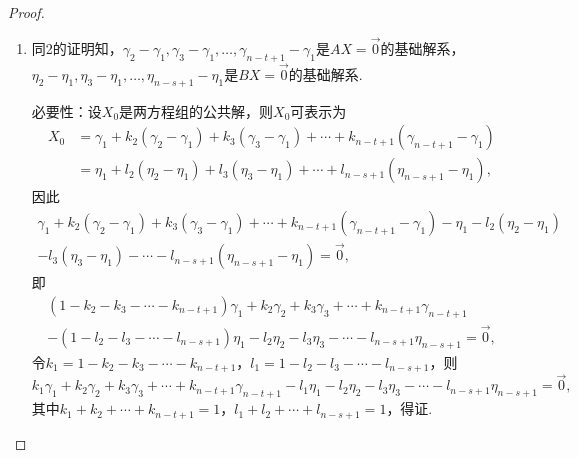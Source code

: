 \begin{proof}
\begin{enumerate}
        \item 同2的证明知，$\gamma_2-\gamma_1,\gamma_3-\gamma_1,\ldots,\gamma_{n-t+1}-\gamma_1$是$AX=\vec{0}$的基础解系，$\eta_2-\eta_1,\eta_3-\eta_1,\ldots,\eta_{n-s+1}-\eta_1$是$BX=\vec{0}$的基础解系.

              必要性：设$X_0$是两方程组的公共解，则$X_0$可表示为
              \begin{align*}
                  X_0 & =\gamma_1+k_2(\gamma_2-\gamma_1)+k_3(\gamma_3-\gamma_1)+\cdots+k_{n-t+1}(\gamma_{n-t+1}-\gamma_1) \\
                      & =\eta_1+l_2(\eta_2-\eta_1)+l_3(\eta_3-\eta_1)+\cdots+l_{n-s+1}(\eta_{n-s+1}-\eta_1),
              \end{align*}
              因此
              \begin{align*}
                  \gamma_1+k_2(\gamma_2-\gamma_1)+k_3(\gamma_3-\gamma_1)+\cdots+k_{n-t+1}(\gamma_{n-t+1}-\gamma_1)-\eta_1-l_2(\eta_2-\eta_1) \\-l_3(\eta_3-\eta_1)-\cdots-l_{n-s+1}(\eta_{n-s+1}-\eta_1)=\vec{0},
              \end{align*}
              即
              \begin{align*}
                  (1-k_2-k_3-\cdots-k_{n-t+1})\gamma_1+k_2\gamma_2+k_3\gamma_3+\cdots+k_{n-t+1}\gamma_{n-t+1} \\-(1-l_2-l_3-\cdots-l_{n-s+1})\eta_1-l_2\eta_2-l_3\eta_3-\cdots-l_{n-s+1}\eta_{n-s+1}=\vec{0},
              \end{align*}
              令$k_1=1-k_2-k_3-\cdots-k_{n-t+1}$，$l_1=1-l_2-l_3-\cdots-l_{n-s+1}$，则
              \[k_1\gamma_1+k_2\gamma_2+k_3\gamma_3+\cdots+k_{n-t+1}\gamma_{n-t+1}-l_1\eta_1-l_2\eta_2-l_3\eta_3-\cdots-l_{n-s+1}\eta_{n-s+1}=\vec{0},\]
              其中$k_1+k_2+\cdots+k_{n-t+1}=1$，$l_1+l_2+\cdots+l_{n-s+1}=1$，得证.


\end{enumerate}
\end{proof}
